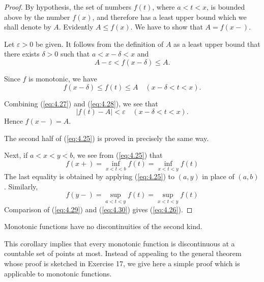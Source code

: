 \begin{proof}
    By hypothesis, the set of numbers $f(t)$, where $a< t < x$, 
    is bounded above by the number $f(x)$, 
    and therefore has a least upper bound which we shall denote by $A$. 
    Evidently $A \leq f(x)$. We have to show that $A =f(x-)$. 
    
    Let $\varepsilon > 0$ be given. 
    It follows from the definition of $A$ 
    as a least upper bound that there exists $\delta > 0$ 
    such that $a < x - \delta < x$ and
    \begin{equation}
        \label{eq:4.27}
        A - \varepsilon < f(x - \delta) \leq A.
    \end{equation}

    Since $f$ is monotonic, we have
    \begin{equation}
        \label{eq:4.28}
        f(x-\delta) \leq f(t) \leq A
        \quad 
        (x-\delta < t < x).
    \end{equation}

    Combining (\ref{eq:4.27}) and (\ref{eq:4.28}), we see that
    \begin{equation*}
        \left| f(t) - A \right| < \varepsilon
        \quad
        (x - \delta < t < x).
    \end{equation*}
    Hence $f(x-) = A$.

    The second half of (\ref{eq:4.25}) is proved in precisely the same way.

    Next, if $a < x < y < b$, we see from (\ref{eq:4.25}) that
    \begin{equation}
        \label{eq:4.29}
        f(x+) 
        = \inf_{x < t < b} f(t)
        = \inf_{x < t < y} f(t)
    \end{equation}
    The last equality is obtained by applying (\ref{eq:4.25}) to $(a, y)$ in place of $(a, b)$. 
    Similarly,
    \begin{equation}
        \label{eq:4.30}
        f(y-) 
        = \sup_{a < t < y} f(t)
        = \sup_{x < t < y} f(t)
    \end{equation}
    Comparison of (\ref{eq:4.29}) and (\ref{eq:4.30}) gives (\ref{eq:4.26}).
\end{proof}

\begin{myCorollary*}
    Monotonic functions have no discontinuities of the second kind.
\end{myCorollary*}

This corollary implies that every monotonic function is discontinuous at a countable set of points at most. 
Instead of appealing to the general theorem whose proof is sketched in Exercise 17, 
we give here a simple proof which is applicable to monotonic functions.

